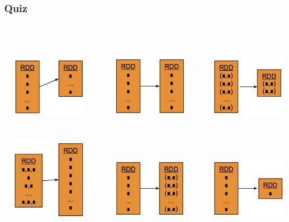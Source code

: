 \documentclass[xcolor={dvipsnames}]{beamer}
\begin{document}
\frame
{
\frametitle{Quiz}

\begin{columns}
\begin{column}{1.25\textwidth}

${}$\\${}$\\

$\quad$\includegraphics[width=1.25in]{stuff/at1.jpg}$\quad\quad\quad$
\includegraphics[width=1.25in]{stuff/at2.jpg}$\quad\quad\quad$\includegraphics[width=1.25in]{stuff/at5.jpg}\\${}$\\${}$\\

$\quad$\includegraphics[width=1.25in]{stuff/at3.jpg}$\quad\quad\quad$
\includegraphics[width=1.25in]{stuff/at4.jpg}$\quad\quad\quad$\includegraphics[width=1.25in]{stuff/at6.jpg}


\end{column}
\end{columns}


}
\end{document}
